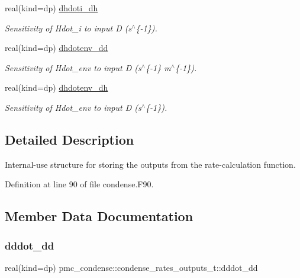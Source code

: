 \begin{DoxyCompactItemize}
real(kind=dp) \mbox{\hyperlink{structpmc__condense_1_1condense__rates__outputs__t_a4a0cf6fc21c0280f966fb0e167199dc9}{dhdoti\+\_\+dh}}
\begin{DoxyCompactList}\small\item\em Sensitivity of {\ttfamily Hdot\+\_\+i} to input {\ttfamily D} (s$^\wedge$\{-\/1\}). \end{DoxyCompactList}\item 
real(kind=dp) \mbox{\hyperlink{structpmc__condense_1_1condense__rates__outputs__t_ab9b0f5395f206bd6e0151a526f84c5ac}{dhdotenv\+\_\+dd}}
\begin{DoxyCompactList}\small\item\em Sensitivity of {\ttfamily Hdot\+\_\+env} to input {\ttfamily D} (s$^\wedge$\{-\/1\} m$^\wedge$\{-\/1\}). \end{DoxyCompactList}\item 
real(kind=dp) \mbox{\hyperlink{structpmc__condense_1_1condense__rates__outputs__t_a21295a1d4cbdb60fb04999dc4f8c7185}{dhdotenv\+\_\+dh}}
\begin{DoxyCompactList}\small\item\em Sensitivity of {\ttfamily Hdot\+\_\+env} to input {\ttfamily D} (s$^\wedge$\{-\/1\}). \end{DoxyCompactList}\end{DoxyCompactItemize}


\subsection{Detailed Description}
Internal-\/use structure for storing the outputs from the rate-\/calculation function. 

Definition at line 90 of file condense.\+F90.



\subsection{Member Data Documentation}
\mbox{\label{structpmc__condense_1_1condense__rates__outputs__t_a7134cf56f816d3cff9812f9d54b99744}} 
\subsubsection{\texorpdfstring{dddot\+\_\+dd}{dddot\_dd}}
{\footnotesize\ttfamily real(kind=dp) pmc\+\_\+condense\+::condense\+\_\+rates\+\_\+outputs\+\_\+t\+::dddot\+\_\+dd}



